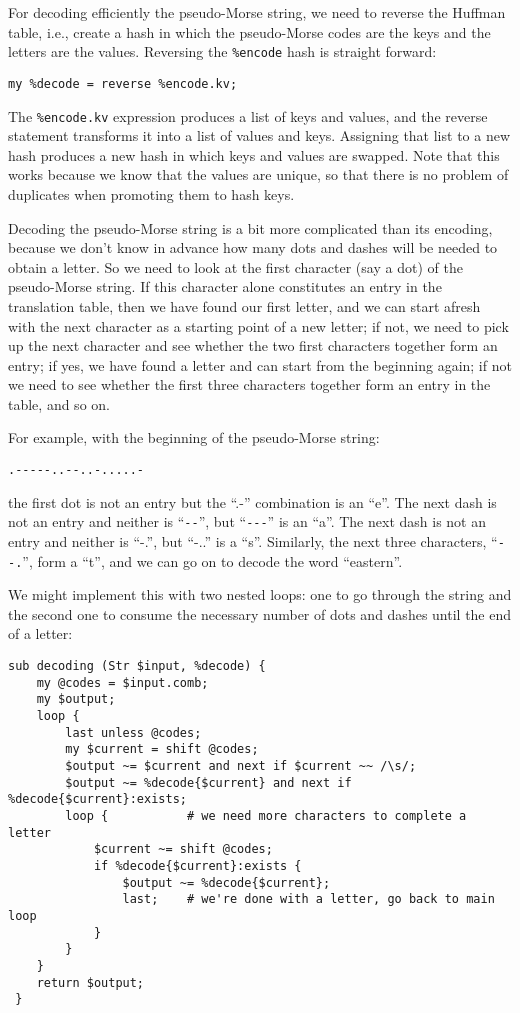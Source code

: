 For decoding efficiently the pseudo-Morse string, we need to reverse 
the Huffman table, i.e., create a hash in which the pseudo-Morse codes 
are the keys and the letters are the values. Reversing the \verb'%encode' 
hash is straight forward:

\begin{verbatim}
my %decode = reverse %encode.kv;
\end{verbatim}

The \verb'%encode.kv' expression produces a list of keys and values, 
and the reverse statement transforms it into a list of values and 
keys. Assigning that list to a new hash produces a new hash in 
which keys and values are swapped. Note that this works because 
we know that the values are unique, so that there is no problem 
of duplicates when promoting them to hash keys.

Decoding the pseudo-Morse string is a bit more complicated than 
its encoding, because we don't know in advance how many dots and 
dashes will be needed to obtain a letter. So we need to look at the 
first character (say a dot) of the pseudo-Morse string. If this 
character alone constitutes an entry in the translation table, 
then we have found our first 
letter, and we can start afresh with the next character as a starting 
point of a new letter; if not, we need to pick up the next character 
and see whether the two first characters together form an entry; if yes, 
we have found a letter and can start from the beginning again; if 
not we need to see whether the first three characters together form an 
entry in the table, and so on.

For example, with the beginning of the pseudo-Morse string:
\begin{verbatim}
.-----..--..-.....-
\end{verbatim}
the first dot is not an entry but the ``.-'' combination is an ``e''.
The next dash is not an entry and neither is ``\verb"--"'', but 
``\verb"---"'' is an ``a''.
The next dash is not an entry and neither is ``-.'', but ``-..'' is a ``s''. 
Similarly, the next three characters, ``\verb"--."'', form a ``t'', and we 
can go on to decode the word ``eastern''.

We might implement this with two nested loops: one to go through the 
string and the second one to consume the necessary number of dots and 
dashes until the end of a letter:

\begin{verbatim}
sub decoding (Str $input, %decode) {
    my @codes = $input.comb;
    my $output;
    loop {
        last unless @codes;
        my $current = shift @codes;
        $output ~= $current and next if $current ~~ /\s/;
        $output ~= %decode{$current} and next if %decode{$current}:exists;
        loop {           # we need more characters to complete a letter
            $current ~= shift @codes;
            if %decode{$current}:exists {
                $output ~= %decode{$current};
                last;    # we're done with a letter, go back to main loop
            }
        }
    }
    return $output;
 }
\end{verbatim}

